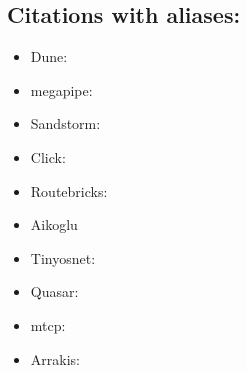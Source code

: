 \subsection{Citations with aliases:}


\begin{itemize}
\item Dune: \cite{dune}
\item megapipe: \cite{megapipe}
\item Sandstorm: \cite{sandstorm}
\item Click: \cite{click}
\item Routebricks: \cite{routebricks}
\item Aikoglu \cite{Atikoglu:2012:WAL}
\item Tinyosnet: \cite{tinyosnet}
\item Quasar: \cite{quasar}
\item mtcp: \cite{mtcp}
\item Arrakis: \cite{arrakis}
\end{itemize}

